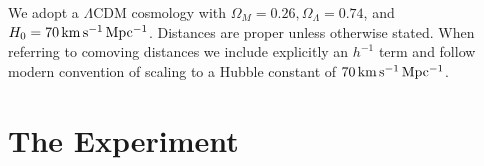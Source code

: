 \documentclass[iop]{emulateapj}
\begin{document}

We adopt a $\Lambda$CDM cosmology with $\Omega_M=0.26, \Omega_\Lambda=0.74$, and 
$H_0=70\,{\rm km\,s^{-1}\,Mpc^{-1}}$. Distances are proper unless otherwise stated. When referring 
to comoving distances we include explicitly an $h^{-1}$ term and follow modern convention of 
scaling to a Hubble constant of $70\,{\rm km\,s^{-1}\,Mpc^{-1}}$. 

\section{The Experiment}
\label{sec:experiment}


%
\end{document}
